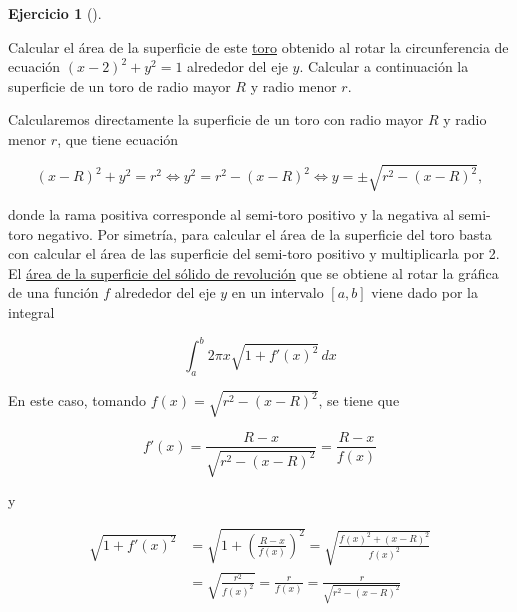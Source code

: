 \documentclass[
  spanish,
  a4paper,
]{scrreport}
\theoremstyle{definition}
\newtheorem{exercise}{Ejercicio}[chapter]
\theoremstyle{remark}
\begin{document}
\begin{exercise}[]\protect\hypertarget{exr-superficie-toro}{}\label{exr-superficie-toro}

Calcular el área de la superficie de este
\href{https://www.geogebra.org/m/wy2uquqc}{toro} obtenido al rotar la
circunferencia de ecuación \((x-2)^2+y^2=1\) alrededor del eje \(y\).
Calcular a continuación la superficie de un toro de radio mayor \(R\) y
radio menor \(r\).

\end{exercise}

\begin{tcolorbox}[enhanced jigsaw, arc=.35mm, bottomrule=.15mm, bottomtitle=1mm, breakable, colback=white, colbacktitle=quarto-callout-tip-color!10!white, colframe=quarto-callout-tip-color-frame, coltitle=black, left=2mm, leftrule=.75mm, opacityback=0, opacitybacktitle=0.6, rightrule=.15mm, title=\textcolor{quarto-callout-tip-color}{\faLightbulb}\hspace{0.5em}{Solución}, titlerule=0mm, toprule=.15mm, toptitle=1mm]

Calcularemos directamente la superficie de un toro con radio mayor \(R\)
y radio menor \(r\), que tiene ecuación

\[
(x-R)^2+y^2=r^2 \Leftrightarrow y^2 = r^2-(x-R)^2 \Leftrightarrow y=\pm \sqrt{r^2-(x-R)^2},
\]

donde la rama positiva corresponde al semi-toro positivo y la negativa
al semi-toro negativo. Por simetría, para calcular el área de la
superficie del toro basta con calcular el área de las superficie del
semi-toro positivo y multiplicarla por 2. El
\href{https://aprendeconalf.es/analisis-manual/08-integrales.html\#c\%C3\%A1lculo-de-superficies-de-s\%C3\%B3lidos-de-revoluci\%C3\%B3n}{área
de la superficie del sólido de revolución} que se obtiene al rotar la
gráfica de una función \(f\) alrededor del eje \(y\) en un intervalo
\([a,b]\) viene dado por la integral

\[
\int_a^b 2\pi x \sqrt{1+f'(x)^2}\,dx
\]

En este caso, tomando \(f(x)=\sqrt{r^2-(x-R)^2}\), se tiene que

\[
f'(x) = \frac{R-x}{\sqrt{r^2-(x-R)^2}} = \frac{R-x}{f(x)}
\]

y

\begin{align*}
\sqrt{1+f'(x)^2} 
&= \sqrt{1+\left(\frac{R-x}{f(x)}\right)^2}
= \sqrt{\frac{f(x)^2+(x-R)^2}{f(x)^2}} \\
&= \sqrt{\frac{r^2}{f(x)^2}}
= \frac{r}{f(x)}
= \frac{r}{\sqrt{r^2-(x-R)^2}}
\end{align*}


\end{tcolorbox}
\end{document}

